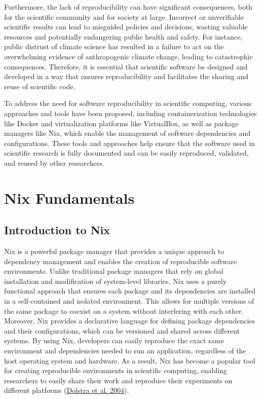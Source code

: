 \documentclass[
]{article}
\begin{document}
Furthermore, the lack of reproducibility can have significant consequences, both for the scientific community and for society at large. Incorrect or unverifiable scientific results can lead to misguided policies and decisions, wasting valuable resources and potentially endangering public health and safety. For instance, public distrust of climate science has resulted in a failure to act on the overwhelming evidence of anthropogenic climate change, leading to catastrophic consequences. Therefore, it is essential that scientific software be designed and developed in a way that ensures reproducibility and facilitates the sharing and reuse of scientific code.

To address the need for software reproducibility in scientific computing, various approaches and tools have been proposed, including containerization technologies like Docker and virtualization platforms like VirtualBox, as well as package managers like Nix, which enable the management of software dependencies and configurations. These tools and approaches help ensure that the software used in scientific research is fully documented and can be easily reproduced, validated, and reused by other researchers.

\hypertarget{nix-fundamentals}{%
\section{Nix Fundamentals}\label{nix-fundamentals}}

\hypertarget{introduction-to-nix}{%
\subsection{Introduction to Nix}\label{introduction-to-nix}}

Nix is a powerful package manager that provides a unique approach to dependency management and enables the creation of reproducible software environments. Unlike traditional package managers that rely on global installation and modification of system-level libraries, Nix uses a purely functional approach that ensures each package and its dependencies are installed in a self-contained and isolated environment. This allows for multiple versions of the same package to coexist on a system without interfering with each other. Moreover, Nix provides a declarative language for defining package dependencies and their configurations, which can be versioned and shared across different systems. By using Nix, developers can easily reproduce the exact same environment and dependencies needed to run an application, regardless of the host operating system and hardware. As a result, Nix has become a popular tool for creating reproducible environments in scientific computing, enabling researchers to easily share their work and reproduce their experiments on different platforms (\protect\hyperlink{ref-dolstra2004nix}{Dolstra et al. 2004}).
\end{document}
